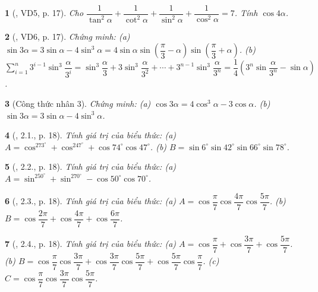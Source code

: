 \documentclass{article}
\newtheorem{baitoan}{}
\begin{document}
\begin{baitoan}[\cite{Hung_nang_cao_phat_trien_Toan_11_tap_1}, VD5, p. 17]
	Cho $\dfrac{1}{\tan^2\alpha} + \dfrac{1}{\cot^2\alpha} + \dfrac{1}{\sin^2\alpha} + \dfrac{1}{\cos^2\alpha} = 7$. Tính $\cos4\alpha$.
\end{baitoan}

\begin{baitoan}[\cite{Hung_nang_cao_phat_trien_Toan_11_tap_1}, VD6, p. 17]
	Chứng minh: (a) $\sin3\alpha = 3\sin\alpha - 4\sin^3\alpha = 4\sin\alpha\sin\left(\dfrac{\pi}{3} - \alpha\right)\sin\left(\dfrac{\pi}{3} + \alpha\right)$. (b) $\sum_{i=1}^n 3^{i-1}\sin^3\dfrac{\alpha}{3^i} = \sin^3\dfrac{\alpha}{3} + 3\sin^3\dfrac{\alpha}{3^2} + \cdots + 3^{n-1}\sin^3\dfrac{\alpha}{3^n} = \dfrac{1}{4}\left(3^n\sin\dfrac{\alpha}{3^n} - \sin\alpha\right)$.
\end{baitoan}

\begin{baitoan}[Công thức nhân 3]
	Chứng minh: (a) $\cos3\alpha = 4\cos^3\alpha - 3\cos\alpha$. (b) $\sin3\alpha = 3\sin\alpha - 4\sin^3\alpha$.
\end{baitoan}

\begin{baitoan}[\cite{Hung_nang_cao_phat_trien_Toan_11_tap_1}, 2.1., p. 18]
	Tính giá trị của biểu thức: (a) $A = \cos^273^\circ + \cos^247^\circ + \cos74^\circ\cos47^\circ$. (b) $B = \sin6^\circ\sin42^\circ\sin66^\circ\sin78^\circ$.
\end{baitoan}

\begin{baitoan}[\cite{Hung_nang_cao_phat_trien_Toan_11_tap_1}, 2.2., p. 18]
	Tính giá trị của biểu thức: (a) $A = \sin^250^\circ + \sin^270^\circ - \cos50^\circ\cos70^\circ$.
\end{baitoan}

\begin{baitoan}[\cite{Hung_nang_cao_phat_trien_Toan_11_tap_1}, 2.3., p. 18]
	Tính giá trị của biểu thức: (a) $A = \cos\dfrac{\pi}{7}\cos\dfrac{4\pi}{7}\cos\dfrac{5\pi}{7}$. (b) $B = \cos\dfrac{2\pi}{7} + \cos\dfrac{4\pi}{7} + \cos\dfrac{6\pi}{7}$.
\end{baitoan}

\begin{baitoan}[\cite{Hung_nang_cao_phat_trien_Toan_11_tap_1}, 2.4., p. 18]
	Tính giá trị của biểu thức: (a) $A = \cos\dfrac{\pi}{7} + \cos\dfrac{3\pi}{7} + \cos\dfrac{5\pi}{7}$. (b) $B = \cos\dfrac{\pi}{7}\cos\dfrac{3\pi}{7} + \cos\dfrac{3\pi}{7}\cos\dfrac{5\pi}{7} + \cos\dfrac{5\pi}{7}\cos\dfrac{\pi}{7}$. (c) $C = \cos\dfrac{\pi}{7}\cos\dfrac{3\pi}{7}\cos\dfrac{5\pi}{7}$.
\end{baitoan}
\end{document}
